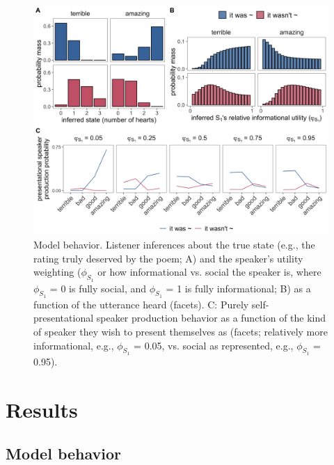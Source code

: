 \documentclass[9pt,twocolumn,twoside,lineno]{main_class_file}
\begin{document}
\begin{figure}[!h]
\includegraphics[width=\columnwidth]{fig/L1_inferences_wS2pres} \centering \caption{Model behavior. Listener inferences about the true state (e.g., the rating truly deserved by the poem; A) and the speaker's utility weighting ($\phi_{S_1}$ or how informational vs. social the speaker is, where $\phi_{S_1}$ = 0 is fully social, and $\phi_{S_1}$ = 1 is fully informational; B) as a function of the utterance heard (facets). C: Purely self-presentational speaker production behavior as a function of the kind of speaker they wish to present themselves as (facets; relatively more informational, e.g., $\phi_{S_1}$ = 0.05, vs. social as represented, e.g., $\phi_{S_1}$ = 0.95).}\label{fig:L1inferences}
\end{figure}


\section*{Results}

\subsection*{Model behavior}
\end{document}

